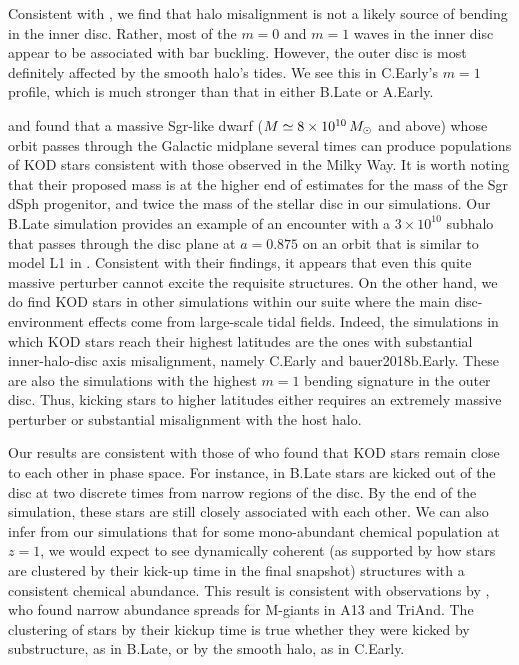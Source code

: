 Consistent with \citet{gomez_2017}, we find that halo misalignment is
not a likely source of bending in the inner disc. Rather, most of the
$m=0$ and $m=1$ waves in the inner disc appear to be associated with
bar buckling. However, the outer disc is most definitely affected by
the smooth halo's tides. We see this in C.Early's $m=1$ profile, which
is much stronger than that in either B.Late or A.Early.

\citet{laporte_2018_b} and \citet{laporte_2019_feathers} found that a
massive Sgr-like dwarf ($M \simeq 8 \times 10^{10} \, M_\odot$ and
above) whose orbit passes through the Galactic midplane several times
can produce populations of KOD stars consistent with those observed
in the Milky Way. It is worth noting that their proposed mass is at
the higher end of estimates for the mass of the Sgr dSph
progenitor, and twice the mass of the stellar disc in our simulations. Our B.Late simulation provides an example of an encounter
with a $3 \times 10^{10}$ subhalo that passes through the disc plane
at $a=0.875$ on an orbit that is similar to model L1 in
\citet{laporte_2018_b}. Consistent with their findings, it appears
that even this quite massive perturber cannot excite the requisite
structures. On the other hand, we do find KOD stars in other
simulations within our suite where the main disc-environment effects
come from large-scale tidal fields. Indeed, the simulations in which
KOD stars reach their highest latitudes are the ones with substantial
inner-halo-disc axis misalignment, namely C.Early and
bauer2018b.Early. These are also the simulations with the highest
$m=1$ bending signature in the outer disc.  Thus, kicking stars to
higher latitudes either requires an extremely massive perturber or
substantial misalignment with the host halo.

Our results are consistent with those of \citet{laporte_2019_feathers}
who found that KOD stars remain close to each other in phase space. For
instance, in B.Late stars are kicked out of the disc at two discrete
times from narrow regions of the disc. By the end of the simulation,
these stars are still closely associated with each other.  We can also
infer from our simulations that for some mono-abundant chemical
population at $z=1$, we would expect to see dynamically coherent (as
supported by how stars are clustered by their kick-up time in the
final snapshot) structures with a consistent chemical abundance. This
result is consistent with observations by \citet{bergemann_2018}, who
found narrow abundance spreads for M-giants in A13 and TriAnd. The
clustering of stars by their kickup time is true whether they were
kicked by substructure, as in B.Late, or by the smooth halo, as in
C.Early.

